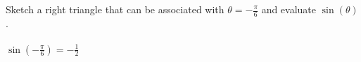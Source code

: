 {Sketch a right triangle that can be associated with $\theta = -\frac{\pi}{6}$ and evaluate $\sin{(\theta)}$.}
{\text{}\\ \label{fig:03_05_ex_14}\\
$\sin{(-\frac{\pi}{6})} =-\frac{1}{2}$}
